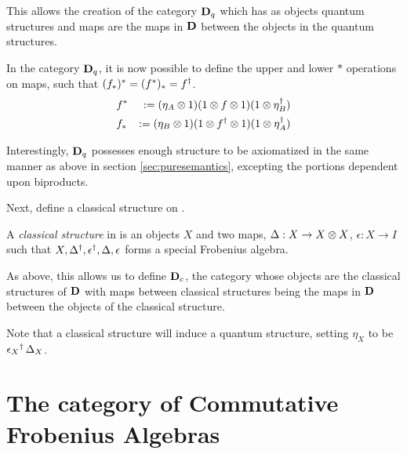 This allows the creation of the category $\mathbf{D}_{q}$ which has as objects quantum structures and maps
are the maps in $\mathbf{D}$ between the objects in the quantum structures.

In the category $\mathbf{D}_{q}$, it is now possible to define the upper and lower $*$ operations on maps,
such that $(f_{*})^{*}= (f^{*})_{*} = {f}^{\dagger}$.
\begin{eqnarray*}
&f^{*} &:= (\eta_{A}\otimes1) (1 \otimes f\otimes1) (1\otimes{\eta}^{\dagger}_{B})\\
&f_{*} &:= (\eta_{B}\otimes1) (1 \otimes {f}^{\dagger}\otimes1) (1\otimes{\eta}^{\dagger}_{A})
\end{eqnarray*}

Interestingly, $\mathbf{D}_{q}$ possesses enough structure to be axiomatized in the same manner as above in
section \ref{sec:puresemantics}, excepting the portions dependent upon biproducts.

Next, define a classical structure on \cD.
\begin{definition}\label{def:classicalstructure}
  A \emph{classical structure} in \cD{} is an objects $X$ and two maps, $\Delta :X \to X\otimes X$,
  $\epsilon:X\to I$ such that $X,{\Delta}^{\dagger},{\epsilon}^{\dagger},\Delta,\epsilon$ forms a special
  Frobenius algebra.
\end{definition}

As above, this allows us to define $\mathbf{D}_{c}$, the category whose objects are the classical
structures of $\mathbf{D}$ with maps between classical structures being the maps in $\mathbf{D}$ between the
objects of the classical structure.

Note that a classical structure will induce a quantum structure, setting $\eta_{X}$ to be
${\epsilon_{X}}^{\dagger}\, \Delta_{X}$.

\section{The category of Commutative Frobenius Algebras} %
\label{sec:the_category_of_commutative_frobenius_algebras}

